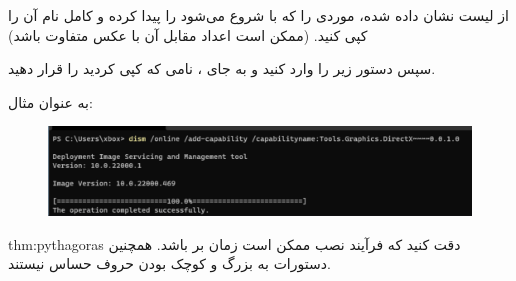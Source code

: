 {\begin{spacing}{1.5}
        از لیست نشان داده شده، موردی را که با  شروع می‌شود را پیدا کرده و کامل نام آن را کپی کنید. (ممکن است اعداد مقابل آن با عکس متفاوت باشد)

        سپس دستور زیر را وارد کنید و به جای ، نامی که کپی کردید را قرار دهید.

        \begin{flushleft}
        \end{flushleft}

        به عنوان مثال:

        \begin{flushleft}
            \normalsize
        \end{flushleft}

        \begin{figure}[H]
            \centering
            \setlength{\belowcaptionskip}{-10pt}
            \includegraphics[width=\textwidth]{Images/3/3.Intro.4.4}
            \caption*{}
        \end{figure}
    \end{spacing}
}
\textbf{\vspace{-10pt}}

\begin{theo}{thm:pythagoras}
{
    \Large
    دقت کنید که فرآیند نصب ممکن است زمان بر باشد. همچنین دستورات  به بزرگ و کوچک بودن حروف حساس نیستند.
}
\end{theo}
\textbf{\vspace{12pt}}

\title{
    \Large
}
\textbf{\vspace{-10pt}}


